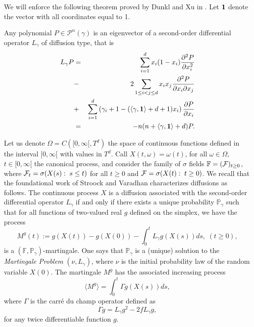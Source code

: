 \documentclass[12pt]{article}
\newcommand{\pol}[2]{\mathcal{P}^{#1}(#2)}
\begin{document}
We will enforce the following theorem proved by Dunkl and Xu in \citep{Dunkl-Xu}. Let $\mathbf{1}$ denote the vector with all coordinates equal to 1.
\begin{thm}\label{Th_Dunkl-Xu}
    Any polynomial $P\in\pol{n}{\gamma}$ is an eigenvector of a second-order differential operator $L_\gamma$ of diffusion type, that is
    \begin{eqnarray}
        L_\gamma P&=&\sum_{i=1}^d x_i(1-x_i)\frac{\partial^2 P}{\partial x_i^2}\nonumber\\
        &-&2\sum_{1\leq i<j\leq d}x_ix_j\frac{\partial^2 P}{\partial x_i\partial x_j}\label{dunkl}\\
        &+&\sum_{i=1}^d \left (\gamma_i+1-(\langle\gamma,\mathbf{1}\rangle+d+1)x_i\right)\frac{\partial P}{\partial x_i}\nonumber\\
        &=&-n(n+\langle\gamma,\mathbf{1}\rangle+d)P.\nonumber
    \end{eqnarray}
\end{thm}


Let us denote $\Omega=C([0,\infty[,T^d)$ the space of continuous functions defined in the interval $[0,\infty[$ with values in $T^d$. Call $X(t,\omega)=\omega (t)$, for all $\omega\in \Omega$, $t\in [0,\infty[$ the canonical process, and consider the family of $\sigma$ fields $\mathbb{F}=(\mathcal{F})_{t\geq 0}$, where $\mathcal{F}_t=\sigma (X(s):\;s\leq t)$ for all $t\geq 0$ and $\mathcal{F}=\sigma (X(t):\;t \geq 0)$. We recall that the foundational work of Stroock and Varadhan characterizes diffusions as follows\cite{w.stroock1969diffusion, w.stroock1969diffusion, chetrite2021e}. The continuous process $X$ is a diffusion associated with the second-order differential operator $L_\gamma$ if and only if there exists a unique probability $\mathbb{P}_\gamma$ such that for all functions of two-valued real $g$ defined on the simplex, we have the process
\begin{equation}\label{mart-problem}
    M^g(t):=g(X(t))-g(X(0))-\int_0^tL_\gamma g(X(s))ds, \;(t\geq 0),
\end{equation}
is a $(\mathbb{F},\mathbb{P}_\gamma)$-martingale. One says that $\mathbb{P}_\gamma$ is a (unique) solution to the \textit{Martingale Problem} $(\nu,L_\gamma)$, where $\nu$ is the initial probability law of the random variable $X(0)$. The martingale $M^g$ has the associated increasing process
\begin{equation}\label{carre1}
    \langle M^g\rangle=\int_0^t\Gamma  g(X(s))ds,
\end{equation}
where $\Gamma$ is the carré du champ operator defined as
\begin{equation}\label{carre}
    \Gamma g=L_\gamma g^2-2fL_\gamma g,
\end{equation}
for any twice differentiable function $g$.
\end{document}
